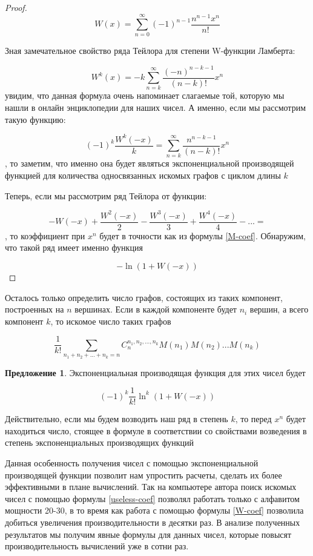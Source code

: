 \documentclass[10pt, a4paper]{report}
\theoremstyle{definition}
\newtheorem{remark}{Предложение}[chapter]
\renewcommand{\log}{\ln}
\begin{document}
\begin{proof}

$$
W(x) = \sum_{n=0}^{\infty} (-1)^{n-1}\frac{n^{n-1}x^n}{n!}
$$ 

Зная замечательное свойство ряда Тейлора для степени W-функции Ламберта:

$$
W^k(x) = -k \sum_{n=k}^\infty \frac{(-n)^{n-k-1}}{(n-k)!}x^n
$$ 
увидим, что данная формула очень напоминает слагаемые той, которую мы нашли в онлайн энциклопедии для наших чисел. А именно, если мы рассмотрим такую функцию:

\begin{equation}
\label{cycle-coef}
(-1)^{k} \frac{W^k(-x)}{k} =  \sum_{n=k}^\infty \frac{n^{n-k-1}}{(n-k)!}x^n
\end{equation} , то заметим, что именно она будет являться экспоненциальной производящей функцией для количества односвязанных искомых графов с циклом длины $k$

Теперь, если мы рассмотрим ряд Тейлора от функции:

$$
- W(-x) + \frac{W^2(-x)}{2} - \frac{W^3(-x)}{3} + \frac{W^4(-x)}{4} - ... =
$$ , то коэффициент при $x^n$ будет в точности как из формулы \eqref{M-coef}. Обнаружим, что такой ряд имеет именно функция 

$$
-\log(1+W(-x))
$$
\end{proof}

Осталось только определить число графов, состоящих из таких компонент, построенных на $n$ вершинах. 
Если в каждой компоненте будет $n_i$ вершин, а всего компонент $k$, то искомое число таких графов

\begin{equation}
\label{useless-coef}
\frac 1 {k!} \sum_{n_1+n_2+...+n_k=n} C^{n_1, n_2, ..., n_k}_n M(n_1)M(n_2)...M(n_k)
\end{equation}

\begin{remark}
	Экспоненциальная производящая функция для этих чисел будет
	
	\begin{equation}
	\label{W-coef}
	(-1)^k \frac 1 {k!} \ln^k(1+W(-x))
	\end{equation}
	
	Действительно, если мы будем возводить наш ряд в степень $k$, то перед $x^n$ будет находиться число, стоящее в формуле в соответствии со свойствами возведения в степень экспоненциальных производящих функций
\end{remark}


Данная особенность получения чисел с помощью экспоненциальной производящей функции позволит нам упростить расчеты, сделать их более эффективными в плане вычислений. Так на компьютере автора поиск искомых чисел с помощью формулы \eqref{useless-coef} позволял работать только с алфавитом мощности 20-30, в то время как работа с помощью формулы \eqref{W-coef} позволила добиться увеличения производительности в десятки раз. В анализе полученных результатов мы получим явные формулы для данных чисел, которые повысят производительность вычислений уже в сотни раз.
\end{document}
